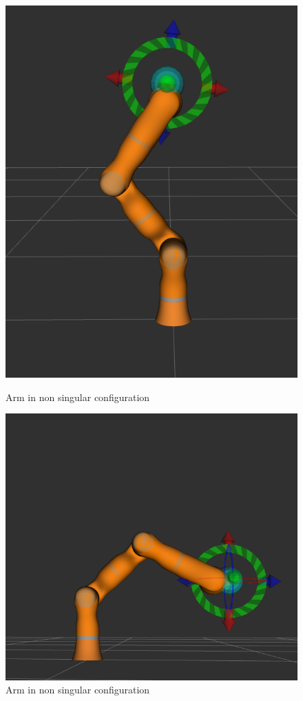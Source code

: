 \begin{figure}[h!]
	\centering
	\begin{minipage}{0.35\textwidth}
		\centering
		\includegraphics[scale=0.25]{images/kukaconfiguration1}
		\caption{Arm in non singular configuration}
		\label{nonsingular1}
	\end{minipage}\hfill
	\begin{minipage}{0.35\textwidth}
		\centering
		\includegraphics[width=1.20\textwidth]{images/kukaconfiguration2}
		\caption{Arm in non singular configuration}
		\label{nonsingular2}
	\end{minipage}
\end{figure}


